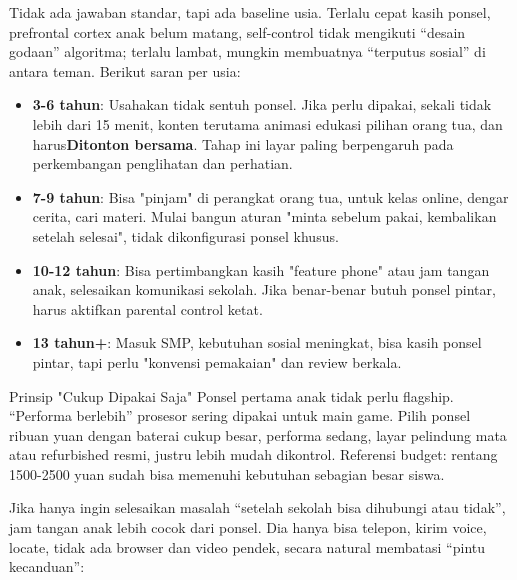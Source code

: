 


Tidak ada jawaban standar, tapi ada baseline usia. Terlalu cepat kasih ponsel, prefrontal cortex anak belum matang, self-control tidak mengikuti “desain godaan” algoritma; terlalu lambat, mungkin membuatnya “terputus sosial” di antara teman. Berikut saran per usia:

\begin{itemize}
  \item \textbf{3-6 tahun}: Usahakan tidak sentuh ponsel. Jika perlu dipakai, sekali tidak lebih dari 15 menit, konten terutama animasi edukasi pilihan orang tua, dan harus\textbf{Ditonton bersama}. Tahap ini layar paling berpengaruh pada perkembangan penglihatan dan perhatian.
  \item \textbf{7-9 tahun}: Bisa "pinjam" di perangkat orang tua, untuk kelas online, dengar cerita, cari materi. Mulai bangun aturan "minta sebelum pakai, kembalikan setelah selesai", tidak dikonfigurasi ponsel khusus.
  \item \textbf{10-12 tahun}: Bisa pertimbangkan kasih "feature phone" atau jam tangan anak, selesaikan komunikasi sekolah. Jika benar-benar butuh ponsel pintar, harus aktifkan parental control ketat.
  \item \textbf{13 tahun+}: Masuk SMP, kebutuhan sosial meningkat, bisa kasih ponsel pintar, tapi perlu "konvensi pemakaian" dan review berkala.
\end{itemize}

\begin{tcbinfo}{Prinsip "Cukup Dipakai Saja"}
Ponsel pertama anak tidak perlu flagship. “Performa berlebih” prosesor sering dipakai untuk main game. Pilih ponsel ribuan yuan dengan baterai cukup besar, performa sedang, layar pelindung mata atau refurbished resmi, justru lebih mudah dikontrol. Referensi budget: rentang 1500-2500 yuan sudah bisa memenuhi kebutuhan sebagian besar siswa.

\end{tcbinfo}


Jika hanya ingin selesaikan masalah “setelah sekolah bisa dihubungi atau tidak”, jam tangan anak lebih cocok dari ponsel. Dia hanya bisa telepon, kirim voice, locate, tidak ada browser dan video pendek, secara natural membatasi “pintu kecanduan”:

